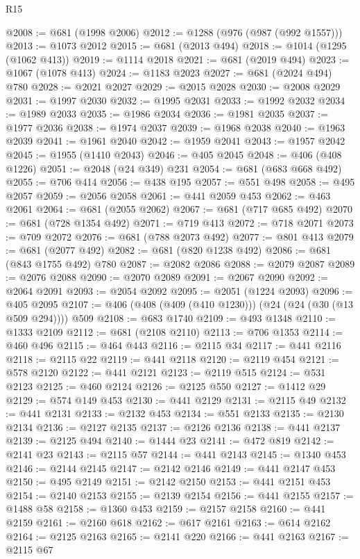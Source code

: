 \begin{lexlean}{R15}
\begin{coremodule}
@2008 := @681 (@1998 @2006)
@2012 := @1288 (@976 (@987 (@992 @1557)))
@2013 := @1073 @2012
@2015 := @681 (@2013 @494)
@2018 := @1014 (@1295 (@1062 @413))
@2019 := @1114 @2018
@2021 := @681 (@2019 @494)
@2023 := @1067 (@1078 @413)
@2024 := @1183 @2023
@2027 := @681 (@2024 @494) @780
@2028 := @2021 @2027
@2029 := @2015 @2028
@2030 := @2008 @2029
@2031 := @1997 @2030
@2032 := @1995 @2031
@2033 := @1992 @2032
@2034 := @1989 @2033
@2035 := @1986 @2034
@2036 := @1981 @2035
@2037 := @1977 @2036
@2038 := @1974 @2037
@2039 := @1968 @2038
@2040 := @1963 @2039
@2041 := @1961 @2040
@2042 := @1959 @2041
@2043 := @1957 @2042
@2045 := @1955 (@1410 @2043)
@2046 := @405 @2045
@2048 := @406 (@408 @1226)
@2051 := @2048 (@24 @349) @231
@2054 := @681 (@683 @668 @492)
@2055 := @706 @414
@2056 := @438 @195
@2057 := @551 @498
@2058 := @495 @2057
@2059 := @2056 @2058
@2061 := @441 @2059 @453
@2062 := @463 @2061
@2064 := @681 (@2055 @2062)
@2067 := @681 (@717 @685 @492)
@2070 := @681 (@728 @1354 @492)
@2071 := @719 @413
@2072 := @718 @2071
@2073 := @709 @2072
@2076 := @681 (@788 @2073 @492)
@2077 := @801 @413
@2079 := @681 (@2077 @492)
@2082 := @681 (@820 @1238 @492)
@2086 := @681 (@843 @1755 @492) @780
@2087 := @2082 @2086
@2088 := @2079 @2087
@2089 := @2076 @2088
@2090 := @2070 @2089
@2091 := @2067 @2090
@2092 := @2064 @2091
@2093 := @2054 @2092
@2095 := @2051 (@1224 @2093)
@2096 := @405 @2095
@2107 := @406 (@408 (@409 (@410 @1230))) (@24 (@24 (@30 (@13 @509 @294)))) @509
@2108 := @683 @1740
@2109 := @493 @1348
@2110 := @1333 @2109
@2112 := @681 (@2108 @2110)
@2113 := @706 @1353
@2114 := @460 @496
@2115 := @464 @443
@2116 := @2115 @34
@2117 := @441 @2116
@2118 := @2115 @22
@2119 := @441 @2118
@2120 := @2119 @454
@2121 := @578 @2120
@2122 := @441 @2121
@2123 := @2119 @515
@2124 := @531 @2123
@2125 := @460 @2124
@2126 := @2125 @550
@2127 := @1412 @29
@2129 := @574 @149 @453
@2130 := @441 @2129
@2131 := @2115 @49
@2132 := @441 @2131
@2133 := @2132 @453
@2134 := @551 @2133
@2135 := @2130 @2134
@2136 := @2127 @2135
@2137 := @2126 @2136
@2138 := @441 @2137
@2139 := @2125 @494
@2140 := @1444 @23
@2141 := @472 @819
@2142 := @2141 @23
@2143 := @2115 @57
@2144 := @441 @2143
@2145 := @1340 @453
@2146 := @2144 @2145
@2147 := @2142 @2146
@2149 := @441 @2147 @453
@2150 := @495 @2149
@2151 := @2142 @2150
@2153 := @441 @2151 @453
@2154 := @2140 @2153
@2155 := @2139 @2154
@2156 := @441 @2155
@2157 := @1488 @58
@2158 := @1360 @453
@2159 := @2157 @2158
@2160 := @441 @2159
@2161 := @2160 @618
@2162 := @617 @2161
@2163 := @614 @2162
@2164 := @2125 @2163
@2165 := @2141 @220
@2166 := @441 @2163
@2167 := @2115 @67

\end{coremodule}
\end{lexlean}
